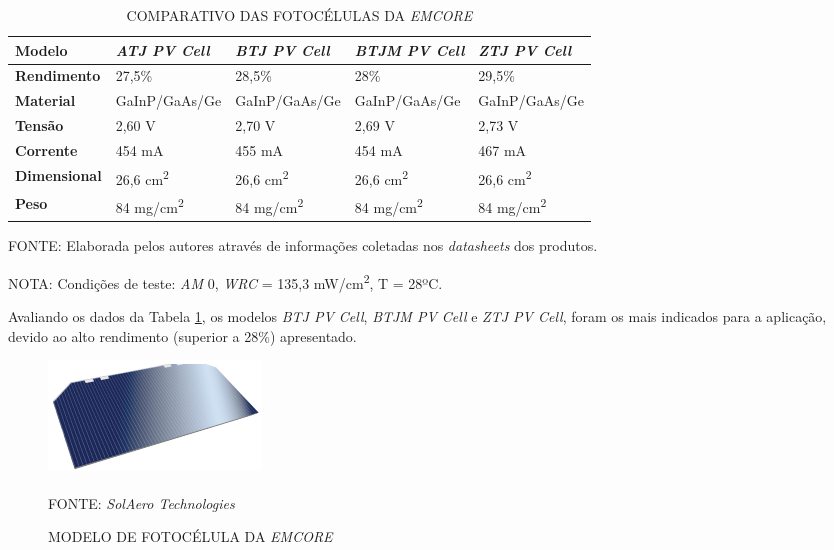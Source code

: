 \documentclass[
	12pt,				%
	openright,			%
	oneside,			%
	a4paper,			%
	english,			%
	french,				%
	spanish,			%
	brazil,				%
	oldfontcommands
	]{abntex2}
\begin{document}
	\begin{table}[th]
	\caption{COMPARATIVO DAS FOTOCÉLULAS DA \textit{EMCORE}}
	\label{Tab_Emcore_Comp}
	\begin{tabular}{p{2.5cm}|p{3.1cm}|p{3.1cm}|p{3.1cm}|p{3.1cm}}
		\textbf{Modelo} & \textit{\textbf{ATJ PV Cell}} & \textit{\textbf{BTJ PV Cell}} & \textit{\textbf{BTJM PV Cell}} & \textit{\textbf{ZTJ PV Cell}} \\
		\hline
		\textbf{Rendimento} & 27,5\% & 28,5\% & 28\% & 29,5\% \\
		\hline
		\textbf{Material} & GaInP/GaAs/Ge & GaInP/GaAs/Ge & GaInP/GaAs/Ge & GaInP/GaAs/Ge\\
		\hline
		\textbf{Tensão} & 2,60 V & 2,70 V & 2,69 V & 2,73 V\\
		\hline
		\textbf{Corrente} & 454 mA & 455 mA & 454 mA & 467 mA\\
		\hline
		\textbf{Dimensional} & 26,6 cm\textsuperscript{2} & 26,6 cm\textsuperscript{2} & 26,6 cm\textsuperscript{2} & 26,6 cm\textsuperscript{2}\\
		\hline
		\textbf{Peso} & 84 mg/cm\textsuperscript{2} & 84 mg/cm\textsuperscript{2} & 84 mg/cm\textsuperscript{2} & 84 mg/cm\textsuperscript{2}\\
	\end{tabular}
	
	\begin{small}
	\vspace{3pt}
		FONTE: Elaborada pelos autores através de informações coletadas nos \textit{datasheets} dos produtos.
	\end{small}
	\begin{footnotesize}
		NOTA: Condições de teste: \textit{AM} 0, \textit{WRC} = 135,3 mW/cm\textsuperscript{2}, T = 28ºC.
	\end{footnotesize}
	\end{table}
	\pagebreak
	Avaliando os dados da Tabela \ref{Tab_Emcore_Comp}, os modelos \textit{BTJ PV Cell}, \textit{BTJM PV Cell} e \textit{ZTJ PV Cell}, foram os mais indicados para a aplicação, devido ao alto rendimento (superior a 28\%) apresentado.
	
	\begin{figure}[th]
		\caption{MODELO DE FOTOCÉLULA DA \textit{EMCORE}}
		\label{Fig_Cell_Emcore}
		\centering
		\includegraphics[width=0.5\linewidth]{./figs/ZTJ}
			
		\begin{small}
			FONTE: \textit{SolAero Technologies}\textsuperscript{\cite{Emcore3}}
		\end{small}		
	\end{figure}
	
\end{document}
